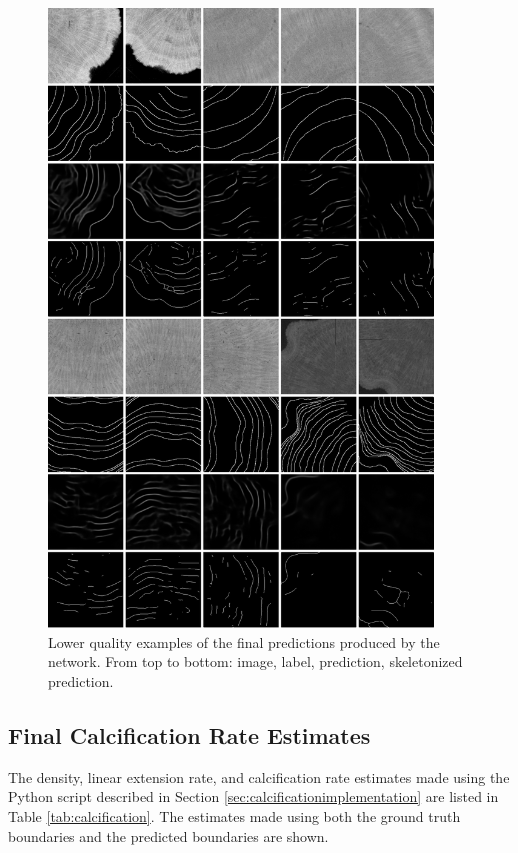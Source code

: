 \begin{figure}[!p]
    \centering
    \includegraphics[width=0.91\textwidth]{images/final-results-bad.png}
    \caption{Lower quality examples of the final predictions produced by the network. From top to bottom: image, label, prediction, skeletonized prediction.}
    \label{fig:finalresultsbad}
\end{figure}

\subsection{Final Calcification Rate Estimates}

The density, linear extension rate, and calcification rate estimates made using the Python script described in Section \ref{sec:calcificationimplementation} are listed in Table \ref{tab:calcification}. The estimates made using both the ground truth boundaries and the predicted boundaries are shown.

